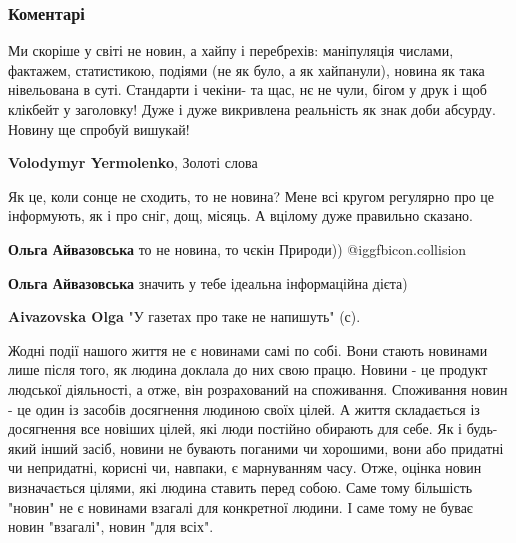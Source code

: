  
 
 
 
 
\subsubsection{Коментарі}
\label{sec:29_09_2021.fb.jermolenko_vladimir.1.svit_novyn.cmt}

\begin{itemize} %

Ми скоріше у світі не новин, а хайпу і перебрехів: маніпуляція числами,
фактажем, статистикою, подіями (не як було, а як хайпанули), новина як така
нівельована в суті. Стандарти і чекіни- та щас, нє не чули, бігом у друк і щоб
клікбейт у заголовку! Дуже і дуже викривлена реальність як знак доби абсурду.
Новину ще спробуй вишукай!

\textbf{Volodymyr Yermolenko}, Золоті слова


Як це, коли сонце не сходить, то не новина? Мене всі кругом регулярно про це
інформують, як і про сніг, дощ, місяць. А вцілому дуже правильно сказано.

\begin{itemize} %
\textbf{Ольга Айвазовська} то не новина, то чєкін Природи)) @igg{fbicon.collision} 

\textbf{Ольга Айвазовська} значить у тебе ідеальна інформаційна дієта)

\textbf{Aivazovska Olga} "У газетах про таке не напишуть" (с).
\end{itemize} %


Жодні події нашого життя не є новинами самі по собі. Вони стають новинами лише
після того, як людина доклала до них свою працю. Новини - це продукт людської
діяльності, а отже, він розрахований на споживання. Споживання новин - це один
із засобів досягнення людиною своїх цілей. А життя складається із досягнення
все новіших цілей, які люди постійно обирають для себе. Як і будь-який інший
засіб, новини не бувають поганими чи хорошими, вони або придатні чи непридатні,
корисні чи, навпаки, є марнуванням часу. Отже, оцінка новин визначається
цілями, які людина ставить перед собою. Саме тому більшість "новин" не є
новинами взагалі для конкретної людини. І саме тому не буває новин "взагалі",
новин "для всіх".


\end{itemize}
